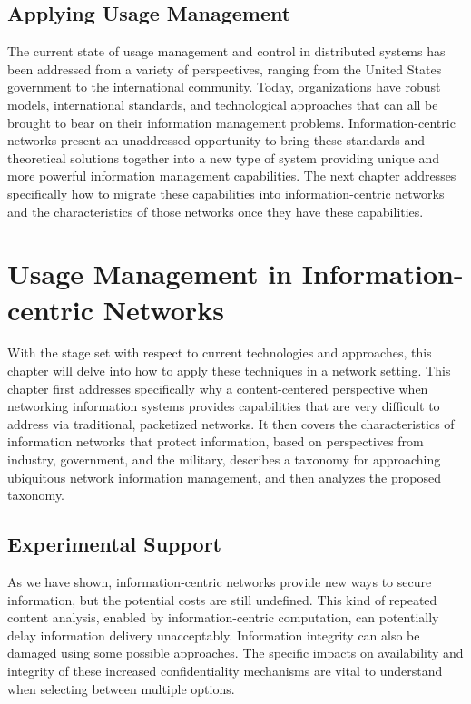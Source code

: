 \documentclass[botnum,fleqn,final]{unmeethesis}
\begin{document}
\section{Applying Usage Management}
The current state of usage management and control in distributed systems has been addressed from a variety of perspectives, ranging from the United States government to the international community.  Today, organizations have robust models, international standards, and technological approaches that can all be brought to bear on their information management problems.  Information-centric networks present an unaddressed opportunity to bring these standards and theoretical solutions together into a new type of system providing unique and more powerful information management capabilities.  The next chapter addresses specifically how to migrate these capabilities into information-centric networks and the characteristics of those networks once they have these capabilities.

\chapter{Usage Management in Information-centric Networks}
With the stage set with respect to current technologies and approaches, this chapter will delve into how to apply these techniques in a network setting.  This chapter first addresses specifically why a content-centered perspective when networking information systems provides capabilities that are very difficult to address via traditional, packetized networks.  It then covers the characteristics of information networks that protect information, based on perspectives from industry, government, and the military, describes a taxonomy for approaching ubiquitous network information management, and then analyzes the proposed taxonomy.




\section{Experimental Support}
As we have shown, information-centric networks provide new ways to secure information, but the potential costs are still undefined.  This kind of repeated content analysis, enabled by information-centric computation, can potentially delay information delivery unacceptably.  Information integrity can also be damaged using some possible approaches.  The specific impacts on availability and integrity of these increased confidentiality mechanisms are vital to understand when selecting between multiple options.
\end{document}
